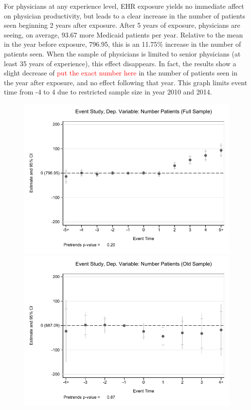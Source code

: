 \documentclass[11pt]{article}
\begin{document}
For physicians at any experience level, EHR exposure yields no immediate affect on physician productivity, but leads to a clear increase in the number of patients seen beginning 2 years after exposure. After 5 years of exposure, physicians are seeing, on average, 93.67 more Medicaid patients per year. Relative to the mean in the year before exposure, 796.95, this is an 11.75\% increase in the number of patients seen. When the sample of physicians is limited to senior physicians (at least 35 years of experience), this effect disappears. In fact, the results show a slight decrease of \textcolor{red}{put the exact number here} in the number of patients seen in the year after exposure, and no effect following that year. This graph limits event time from -4 to 4 due to restricted sample size in year 2010 and 2014. 


\begin{figure}[ht]
\caption{}
        \begin{minipage}[b]{0.47\linewidth}
            \centering
            \includegraphics[width=\textwidth]{Objects/prod_eventstudy_fullsample.pdf}
        \end{minipage}
        \hspace{0.2cm}
        \begin{minipage}[b]{0.47\linewidth}
            \centering
            \includegraphics[width=\textwidth]{Objects/prod_eventstudy_oldsample.pdf}

\end{minipage}
\end{figure}
\end{document}
